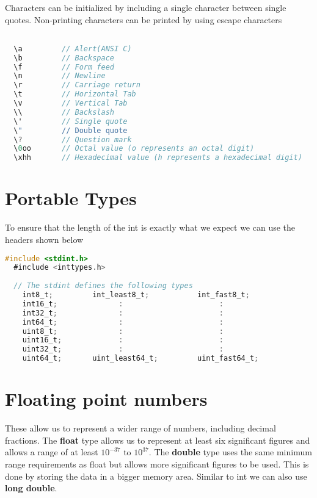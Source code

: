 \documentclass[11pt,a4paper,oneside]{book}
\begin{document}
\noindent Characters can be initialized by including a single character between
single quotes. Non-printing characters can be printed by using escape characters

\begin{lstlisting}[language=C, title=Escape sequences]

  \a         // Alert(ANSI C)
  \b         // Backspace
  \f         // Form feed
  \n         // Newline
  \r         // Carriage return
  \t         // Horizontal Tab
  \v         // Vertical Tab
  \\         // Backslash
  \'         // Single quote
  \"         // Double quote
  \?         // Question mark
  \0oo       // Octal value (o represents an octal digit)
  \xhh       // Hexadecimal value (h represents a hexadecimal digit)
\end{lstlisting}

\section{Portable Types}
To ensure that the length of the int is exactly what we expect we can use the 
headers shown below

\begin{lstlisting}[language=C]
  #include <stdint.h>
  #include <inttypes.h>
  
  // The stdint defines the following types
    int8_t;         int_least8_t;           int_fast8_t;
    int16_t;              :                      :
    int32_t;              :                      :
    int64_t;              :                      :
    uint8_t;              :                      :
    uint16_t;             :                      :
    uint32_t;             :                      :
    uint64_t;       uint_least64_t;         uint_fast64_t;
\end{lstlisting}

\section{Floating point numbers}
These allow us to represent a wider range of numbers, including decimal fractions.
The \textbf{float} type allows us to represent at least six significant figures and
allows a range of at least $10^{-37}$ to $10^{37}$. The \textbf{double} type uses
the same minimum range requirements as float but allows more significant figures to
be used. This is done by storing the data in a bigger memory area. Similar to int
we can also use \textbf{long double}.
\end{document}
